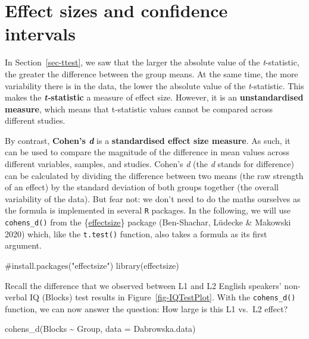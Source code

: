 \documentclass[
  letterpaper,
  DIV=11,
  numbers=noendperiod]{scrreprt}
\newenvironment{Shaded}{\begin{snugshade}}{\end{snugshade}}
\newcommand{\AttributeTok}[1]{\textcolor[rgb]{0.40,0.45,0.13}{#1}}
\newcommand{\CommentTok}[1]{\textcolor[rgb]{0.37,0.37,0.37}{#1}}
\newcommand{\FunctionTok}[1]{\textcolor[rgb]{0.28,0.35,0.67}{#1}}
\newcommand{\NormalTok}[1]{\textcolor[rgb]{0.00,0.23,0.31}{#1}}
\newcommand{\SpecialCharTok}[1]{\textcolor[rgb]{0.37,0.37,0.37}{#1}}
\begin{document}
\section{Effect sizes and confidence intervals}\label{sec-EffectSize}

In Section~\ref{sec-ttest}, we saw that the larger the absolute value of
the \emph{t}-statistic, the greater the difference between the group
means. At the same time, the more variability there is in the data, the
lower the absolute value of the \emph{t}-statistic. This makes the
\textbf{\emph{t-}statistic} a measure of effect size. However, it is an
\textbf{unstandardised measure}, which means that t-statistic values
cannot be compared across different studies.

By contrast, \textbf{Cohen's \emph{d}} is a \textbf{standardised effect
size measure}. As such, it can be used to compare the magnitude of the
difference in mean values across different variables, samples, and
studies. Cohen's \emph{d} (the \emph{d} stands for difference) can be
calculated by dividing the difference between two means (the raw
strength of an effect) by the standard deviation of both groups together
(the overall variability of the data). But fear not: we don't need to do
the maths ourselves as the formula is implemented in several \texttt{R}
packages. In the following, we will use \texttt{cohens\_d()} from the
\{\href{https://easystats.github.io/effectsize/}{effectsize}\} package
(Ben-Shachar, Lüdecke \& Makowski 2020) which, like the
\texttt{t.test()} function, also takes a formula as its first argument.

\begin{Shaded}
\begin{Highlighting}[]
\CommentTok{\#install.packages("effectsize")}
\FunctionTok{library}\NormalTok{(effectsize)}
\end{Highlighting}
\end{Shaded}

Recall the difference that we observed between L1 and L2 English
speakers' non-verbal IQ (Blocks) test results in
Figure~\ref{fig-IQTestPlot}. With the \texttt{cohens\_d()} function, we
can now answer the question: How large is this L1 vs.~L2 effect?

\begin{Shaded}
\begin{Highlighting}[]
\FunctionTok{cohens\_d}\NormalTok{(Blocks }\SpecialCharTok{\textasciitilde{}}\NormalTok{ Group, }
         \AttributeTok{data =}\NormalTok{ Dabrowska.data)}
\end{Highlighting}
\end{Shaded}
\end{document}
